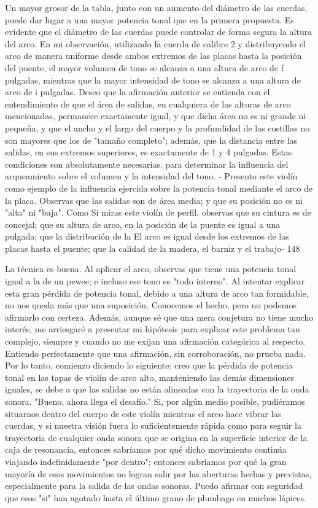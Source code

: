 Un mayor grosor de la tabla, junto con un aumento del diámetro de las cuerdas, puede dar lugar a una mayor potencia tonal que en la primera propuesta.
Es evidente que el diámetro de las cuerdas puede controlar de forma segura la altura del arco. En mi observación, utilizando la cuerda de calibre 2 y distribuyendo el arco de manera uniforme desde ambos extremos de las placas hasta la posición del puente, el mayor volumen de tono se alcanza a una altura de arco de f pulgadas, mientras que la mayor intensidad de tono se alcanza a una altura de arco de i pulgadas. Deseo que la afirmación anterior se entienda con el entendimiento de que el área de salidas, en cualquiera de las alturas de arco mencionadas, permanece exactamente igual, y que dicha área no es ni grande ni pequeña, y que el ancho y el largo del cuerpo y la profundidad de las costillas no son mayores que los de "tamaño completo"; además, que la distancia entre las salidas, en sus extremos superiores, es exactamente de 1 y 4 pulgadas. Estas condiciones son absolutamente necesarias.
para determinar la influencia del arqueamiento sobre el volumen y la intensidad del tono.
- Presento este violín como ejemplo de la influencia ejercida
sobre la potencia tonal mediante el arco de la placa.
Observas que las salidas son de área media; y
que su posición no es ni "alta" ni "baja".
Como
Si miras este violín de perfil, observas
que su cintura es de concejal; que
su altura de arco, en la posición de la
puente es igual a una pulgada; que la distribución de la
El arco es igual desde los extremos de las placas hasta el
puente; que la calidad de la madera, el barniz y el trabajo-
148

La técnica es buena. Al aplicar el arco, observas que tiene una potencia tonal igual a la de un pewee; e incluso ese tono es "todo interno".
Al intentar explicar esta gran pérdida de potencia tonal, debido a una altura de arco tan formidable, no nos queda más que una suposición. Conocemos el hecho, pero no podemos afirmarlo con certeza.
Además, aunque sé que una mera conjetura no tiene mucho interés, me arriesgaré a presentar mi hipótesis para explicar este problema tan complejo, siempre y cuando no me exijan una afirmación categórica al respecto. Entiendo perfectamente que una afirmación, sin corroboración, no prueba nada. Por lo tanto, comienzo diciendo lo siguiente: creo que la pérdida de potencia tonal en las tapas de violín de arco alto, manteniendo las demás dimensiones iguales, se debe a que las salidas no están alineadas con la trayectoria de la onda sonora.
"Bueno, ahora llega el desafío."
Si, por algún medio posible, pudiéramos situarnos dentro del cuerpo de este violín mientras el arco hace vibrar las cuerdas, y si nuestra visión fuera lo suficientemente rápida como para seguir la trayectoria de cualquier onda sonora que se origina en la superficie interior de la caja de resonancia, entonces sabríamos por qué dicho movimiento continúa viajando indefinidamente "por dentro"; entonces sabríamos por qué la gran mayoría de esos movimientos no logran salir por las aberturas hechas y previstas, especialmente para la salida de las ondas sonoras.
Puedo afirmar con seguridad que esos "si" han agotado hasta el último grano de plumbago en muchos lápices.

